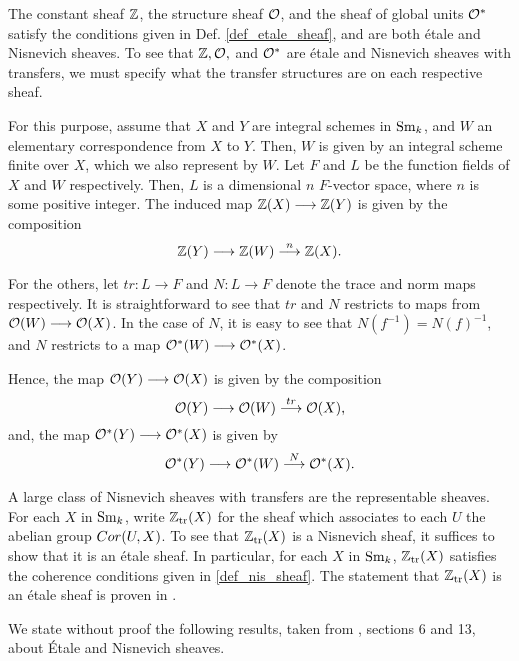 \begin{ex}\label{ex_Z_O_Ostar}
The constant sheaf $\mathbb{Z}$, the structure sheaf $\mathcal{O}$, and the sheaf
of global units $\mathcal{O}^*$ satisfy the conditions given in Def. 
\ref{def_etale_sheaf}, and are both \'etale and Nisnevich sheaves.
To see that $\mathbb{Z}, \mathcal{O},$ and $\mathcal{O}^*$ are \'etale and Nisnevich sheaves
with transfers, we must specify what the transfer structures are
on each respective sheaf.

For this purpose, assume that $X$ and $Y$ are integral schemes
in $\mathrm{Sm}_{k}$, and $W$ an elementary correspondence from $X$ to $Y$. 
Then, $W$ is given by an integral scheme finite over $X$, which we 
also represent by $W$. Let $F$ and $L$ be the function fields of 
$X$ and $W$ respectively. Then, $L$ is a dimensional $n$ 
$F$-vector space, where $n$ is some positive integer. The induced 
map $\mathbb{Z}(X) \longrightarrow \mathbb{Z}(Y)$ is given by the composition
\[
\mathbb{Z}(Y) \longrightarrow \mathbb{Z}(W) \stackrel{n}{\longrightarrow} \mathbb{Z}(X).
\]

For the others, let $tr: L \to F$ and $N: L \to F$ denote the 
trace and norm maps respectively. It is straightforward to see 
that $tr$ and $N$ restricts to maps from $\mathcal{O}(W) \longrightarrow \mathcal{O}(X)$. In
the case of $N$, it is easy to see that $N(f^{-1}) = N(f)^{-1}$,
and $N$ restricts to a map $\mathcal{O}^*(W) \longrightarrow \mathcal{O}^*(X)$.

Hence, the map $\mathcal{O}(Y) \longrightarrow \mathcal{O}(X)$ is given by the composition
\[
\mathcal{O}(Y) \longrightarrow \mathcal{O}(W) \stackrel{tr}{\longrightarrow} \mathcal{O}(X),
\]
and, the map $\mathcal{O}^*(Y) \longrightarrow \mathcal{O}^*(X)$ is given by
\[
\mathcal{O}^*(Y) \longrightarrow \mathcal{O}^*(W) \stackrel{N}{\longrightarrow} \mathcal{O}^*(X).
\]
\end{ex}

\begin{ex}\label{ex_ZtrX}
A large class of Nisnevich sheaves with transfers are the 
representable sheaves. For each $X$ in $\mathrm{Sm}_{k}$, write $\mathbb{Z}_{\mathrm{tr}}(X)$
for the sheaf which associates to each $U$ the abelian group
$Cor(U, X)$. To see that $\mathbb{Z}_{\mathrm{tr}}(X)$ is a Nisnevich sheaf, it
suffices to show that it is an \'etale sheaf. In particular,
for each $X$ in $\mathrm{Sm}_{k}$, $\mathbb{Z}_{\mathrm{tr}}(X)$ satisfies the coherence 
conditions given in \ref{def_nis_sheaf}. The statement that
$\mathbb{Z}_{\mathrm{tr}}(X)$ is an \'etale sheaf is proven in \cite[6.2]{MVW}.
\end{ex}

We state without proof the following results, taken from 
\cite{MVW}, sections 6 and 13, about \'Etale and Nisnevich 
sheaves. 

